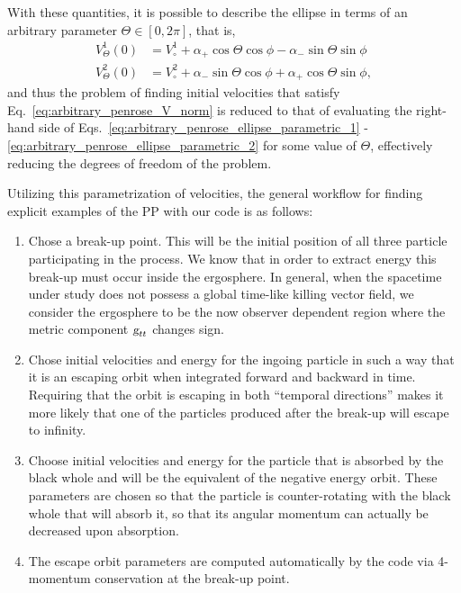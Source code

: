 With these quantities, it is possible to describe the ellipse in terms of an arbitrary parameter $\Theta \in \left[0,2\pi\right]$, that is,
%
\begin{align}
  V^{1}_{\Theta}(0) & =  V^{1}_\circ + \alpha_{+} \cos\Theta\cos\phi - \alpha_{-}\sin\Theta\sin\phi                                                  \label{eq:arbitrary_penrose_ellipse_parametric_1} \\
  V^{2}_{\Theta}(0) & = V^{2}_\circ + \alpha_{-} \sin\Theta\cos\phi + \alpha_{+}\cos\Theta\sin\phi, \label{eq:arbitrary_penrose_ellipse_parametric_2}
\end{align}
%
and thus the problem of finding initial velocities that satisfy Eq.~\eqref{eq:arbitrary_penrose_V_norm} is reduced to that of evaluating the right-hand side of Eqs.~\eqref{eq:arbitrary_penrose_ellipse_parametric_1} - \eqref{eq:arbitrary_penrose_ellipse_parametric_2} for some value of $\Theta$, effectively reducing the degrees of freedom of the problem.

Utilizing this parametrization of velocities, the general workflow for finding explicit examples of the \ac{PP} with our code is as follows:

\begin{enumerate}
  \item Chose a break-up point. This will be the initial position of all three particle participating in the process. We know that in order to extract energy this break-up must occur inside the ergosphere. In general, when the spacetime under study does not possess a global time-like killing vector field, we consider the ergosphere to be the now observer dependent region where the metric component $\mtrtens{t}{t}$ changes sign.
  \item Chose initial velocities and energy for the ingoing particle in such a way that it is an escaping orbit when integrated forward and backward in time. Requiring that the orbit is escaping in both ``temporal directions'' makes it more likely that one of the particles produced after the break-up will escape to infinity.
  \item Choose initial velocities and energy for the particle that is absorbed by the black whole and will be the equivalent of the negative energy orbit. These parameters are chosen so that the particle is counter-rotating with the black whole that will absorb it, so that its angular momentum can actually be decreased upon absorption.
  \item The escape orbit parameters are computed automatically by the code via 4-momentum conservation at the break-up point.
\end{enumerate}

